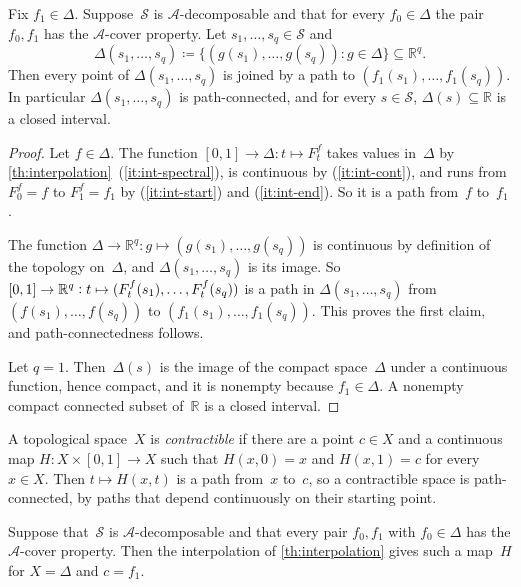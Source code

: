 \documentclass[11pt,letterpaper]{article}
\newcommand{\RR}{\mathbb{R}}
\begin{document}
\begin{corollary}\label{cor:path-connected}
Fix $f_1 \in \Delta$. Suppose~$\mathcal{S}$ is $\mathcal{A}$-decomposable and that for every $f_0 \in \Delta$ the pair $f_0, f_1$ has the $\mathcal{A}$-cover property. Let $s_1, \ldots, s_q \in \mathcal{S}$ and
\[
\Delta(s_1, \ldots, s_q) \coloneqq \{(g(s_1), \ldots, g(s_q)) : g \in \Delta\} \subseteq \RR^q.
\]
Then every point of $\Delta(s_1, \ldots, s_q)$ is joined by a path to $(f_1(s_1), \ldots, f_1(s_q))$. In particular $\Delta(s_1, \ldots, s_q)$ is path-connected, and for every $s \in \mathcal{S}$, $\Delta(s) \subseteq \RR$ is a closed interval.
\end{corollary}
\begin{proof}
Let $f \in \Delta$. The function $[0,1] \to \Delta : t \mapsto F^f_t$ takes values in~$\Delta$ by \cref{th:interpolation}~(\ref{it:int-spectral}), is continuous by (\ref{it:int-cont}), and runs from $F^f_0 = f$ to $F^f_1 = f_1$ by (\ref{it:int-start}) and (\ref{it:int-end}). So it is a path from~$f$ to~$f_1$.

The function $\Delta \to \RR^q : g \mapsto (g(s_1), \ldots, g(s_q))$ is continuous by definition of the topology on~$\Delta$, and $\Delta(s_1, \ldots, s_q)$ is its image. So $[0,1] \to \RR^q : t \mapsto (F^{\smash[t]{f}}_t(s_1), \ldots, F^{\smash[t]{f}}_t(s_q))$ is a path in $\Delta(s_1, \ldots, s_q)$ from $(f(s_1), \ldots, f(s_q))$ to $(f_1(s_1), \ldots, f_1(s_q))$. This proves the first claim, and path-connectedness follows.

Let $q = 1$. Then~$\Delta(s)$ is the image of the compact space~$\Delta$ under a continuous function, hence compact, and it is nonempty because $f_1 \in \Delta$. A nonempty compact connected subset of~$\RR$ is a closed interval.
\end{proof}

A topological space~$X$ is \emph{contractible} if there are a point $c \in X$ and a continuous map $H : X \times [0,1] \to X$ such that $H(x,0) = x$ and $H(x,1) = c$ for every $x \in X$. Then $t \mapsto H(x,t)$ is a path from~$x$ to~$c$, so a contractible space is path-connected, by paths that depend continuously on their starting point. 

Suppose that~$\mathcal{S}$ is $\mathcal{A}$-decomposable and that every pair $f_0, f_1$ with $f_0 \in \Delta$ has the $\mathcal{A}$-cover property. Then the interpolation of \cref{th:interpolation} gives such a map~$H$ for $X = \Delta$ and $c = f_1$.
\end{document}
